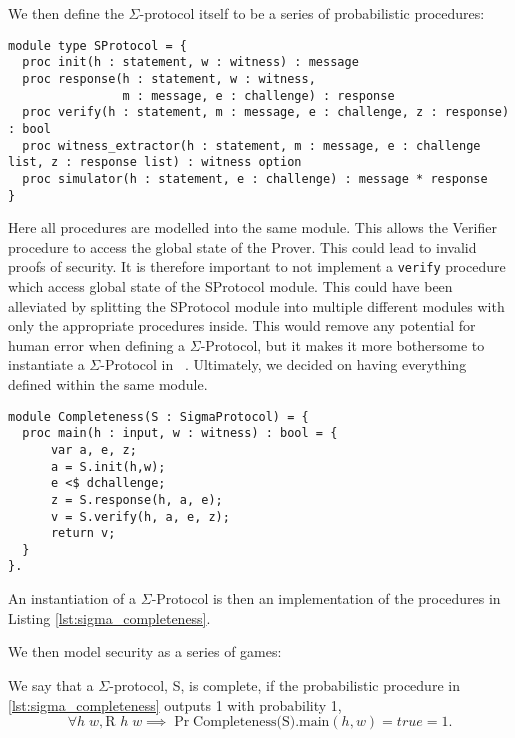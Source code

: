 We then define the $\Sigma$-protocol itself to be a series of probabilistic procedures:
\begin{lstlisting}[label=lst:sigma_procedures,caption= Abstract procedures of $\Sigma$-Protocols]
module type SProtocol = {
  proc init(h : statement, w : witness) : message
  proc response(h : statement, w : witness,
                m : message, e : challenge) : response
  proc verify(h : statement, m : message, e : challenge, z : response) : bool
  proc witness_extractor(h : statement, m : message, e : challenge list, z : response list) : witness option
  proc simulator(h : statement, e : challenge) : message * response
}
\end{lstlisting}

Here all procedures are modelled into the same module. This allows the
Verifier procedure to access the global state of the Prover. This could lead to
invalid proofs of security. It is therefore important to not implement a
\texttt{verify} procedure which access global state of the SProtocol module.
This could have been alleviated by splitting the SProtocol module into multiple
different modules with only the appropriate procedures inside. This would remove
any potential for human error when defining a $\Sigma$-Protocol, but it makes it
more bothersome to instantiate a $\Sigma$-Protocol in \easycrypt\ . Ultimately,
we decided on having everything defined within the same module.


\begin{lstlisting}[float, label=lst:sigma_completeness,caption=Completeness game for $\Sigma$-Protocols]
module Completeness(S : SigmaProtocol) = {
  proc main(h : input, w : witness) : bool = {
      var a, e, z;
      a = S.init(h,w);
      e <$ dchallenge;
      z = S.response(h, a, e);
      v = S.verify(h, a, e, z);
      return v;
  }
}.
\end{lstlisting}

An instantiation of a $\Sigma$-Protocol is then an implementation of the
procedures in Listing \ref{lst:sigma_completeness}.

We then model security as a series of games:

\begin{definition}[Completeness]
\label{def:sigma:completeness}
  We say that a $\Sigma$-protocol, S, is complete, if the probabilistic procedure in
  \ref{lst:sigma_completeness} outputs 1 with probability 1, \ie
  \begin{equation}
    \label{eq:sigma_completeness}
    \forall h \; w, \text{R } h \; w \implies \Pr{ \text{Completeness(S).main}(h,w) = true } = 1.
  \end{equation}
\end{definition}

